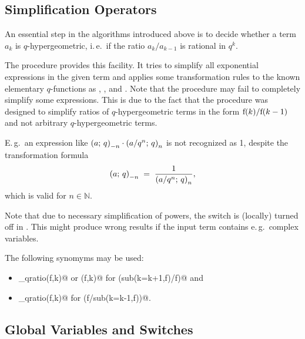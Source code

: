 \subsection{Simplification Operators}
\label{simplification}

An essential step in the algorithms introduced above is to decide
whether a term $a_k$ is $q$-hypergeometric, i.\,e.\ if the
ratio $a_{k}/a_{k-1}$ is rational in $q^k$.

The procedure \verb@qsimpcomb@ provides this facility. It tries to
simplify all exponential expressions in the given term and applies
some transformation rules to the known elementary $q$-functions
as \verb@qpochhammer@, \verb@qbrackets@, \verb@qbinomial@
and \verb@qfactorial@. Note that the procedure may fail to
completely simplify some expressions. This is due to the fact that the
procedure was designed to simplify ratios of $q$-hypergeometric
terms in the form $\fcn{f}{k}/\fcn{f}{k-1}$ and not arbitrary 
$q$-hypergeometric terms. 

E.\,g.\ an expression like 
$\qfac{a}{-n}\cdot\qfac{a/q^n}{n}$
is not recognized as 1, despite the transformation formula
\[ \qfac{a}{-n} \;=\; \frac{1}{\qfac{a/q^n}{n}},\]
which is valid for $n\in\mathbb{N}$.

Note that due to necessary simplification of powers, the switch
\verb@precise@ is (locally) turned off in \verb@qsimpcomb@. This
might produce wrong results if the input term contains 
e.\,g.\ complex variables.

The following synomyms may be used:
\begin{itemize}
	\item \verb@up_qratio(f,k)@ or \verb@qratio(f,k)@ for
		\verb@qsimpcomb(sub(k=k+1,f)/f)@ and
	\item \verb@down_qratio(f,k)@ for \verb@qsimpcomp(f/sub(k=k-1,f))@.
\end{itemize}


\subsection{Global Variables and Switches}
\label{switches}

